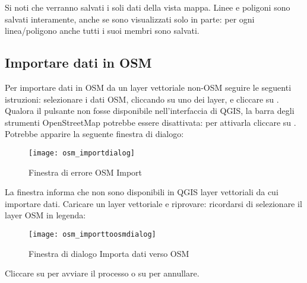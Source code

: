 Si noti che verranno salvati i soli dati della vista mappa. Linee e poligoni sono salvati interamente, 
anche se sono visualizzati solo in parte: per ogni linea/poligono anche tutti i suoi membri sono salvati.

\subsection{Importare dati in OSM}

Per importare dati in OSM da un layer vettoriale non-OSM seguire le seguenti istruzioni: selezionare 
i dati OSM, cliccando su uno dei layer, e cliccare su . 
Qualora il pulsante non fosse disponibile nell'interfaccia di QGIS, la barra degli strumenti OpenStreetMap 
potrebbe essere disattivata: per attivarla cliccare su  \arrow
{} \arrow {}. 
Potrebbe apparire la seguente finestra di dialogo:

\begin{figure}[ht]
   \centering
   \texttt{[image: osm\_importdialog]}
   \caption{Finestra di errore OSM Import\nixcaption}\label{fig:osmimportmessage}
\end{figure}

La finestra informa che non sono disponibili in QGIS layer vettoriali da cui importare dati. Caricare un layer 
vettoriale e riprovare: ricordarsi di selezionare il layer OSM in legenda:

\begin{figure}[ht]
   \centering
   \texttt{[image: osm\_importtoosmdialog]}
   \caption{Finestra di dialogo Importa dati verso OSM \nixcaption}\label{fig:osmimporttoosm}
\end{figure}

Cliccare su  per avviare il processo o su  per annullare.

\FloatBarrier
